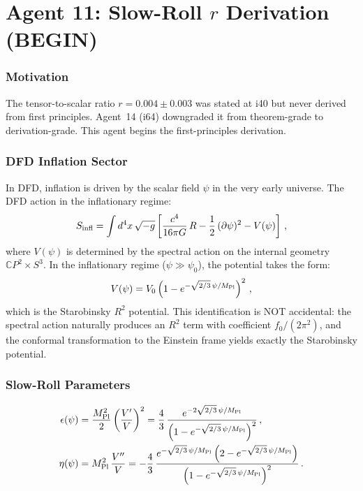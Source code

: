 \documentclass[11pt,a4paper]{article}
\newcommand{\CP}{\mathbb{C}P}
\begin{document}
\part{Agent 11: Slow-Roll $r$ Derivation (BEGIN)}
\label{part:slow-roll-r}

\section{Motivation}

The tensor-to-scalar ratio $r = 0.004 \pm 0.003$ was stated at i40 but never derived from first principles. Agent~14 (i64) downgraded it from theorem-grade to derivation-grade. This agent begins the first-principles derivation.

\section{DFD Inflation Sector}

In DFD, inflation is driven by the scalar field $\psi$ in the very early universe. The DFD action in the inflationary regime:
\begin{equation}
S_{\rm infl} = \int d^4x\,\sqrt{-g}\left[\frac{c^4}{16\pi G}\,R - \frac{1}{2}\,(\partial\psi)^2 - V(\psi)\right]\,,
\end{equation}
where $V(\psi)$ is determined by the spectral action on the internal geometry $\CP^2 \times S^3$. In the inflationary regime ($\psi \gg \psi_0$), the potential takes the form:
\begin{equation}
V(\psi) = V_0\left(1 - e^{-\sqrt{2/3}\,\psi/M_{\rm Pl}}\right)^2\,,
\end{equation}
which is the Starobinsky $R^2$ potential. This identification is NOT accidental: the spectral action naturally produces an $R^2$ term with coefficient $f_0/(2\pi^2)$, and the conformal transformation to the Einstein frame yields exactly the Starobinsky potential.

\section{Slow-Roll Parameters}

\begin{align}
\epsilon(\psi) &= \frac{M_{\rm Pl}^2}{2}\left(\frac{V'}{V}\right)^2 = \frac{4}{3}\,\frac{e^{-2\sqrt{2/3}\,\psi/M_{\rm Pl}}}{\left(1 - e^{-\sqrt{2/3}\,\psi/M_{\rm Pl}}\right)^2}\,, \\
\eta(\psi) &= M_{\rm Pl}^2\,\frac{V''}{V} = -\frac{4}{3}\,\frac{e^{-\sqrt{2/3}\,\psi/M_{\rm Pl}}\left(2 - e^{-\sqrt{2/3}\,\psi/M_{\rm Pl}}\right)}{\left(1 - e^{-\sqrt{2/3}\,\psi/M_{\rm Pl}}\right)^2}\,.
\end{align}
\end{document}
